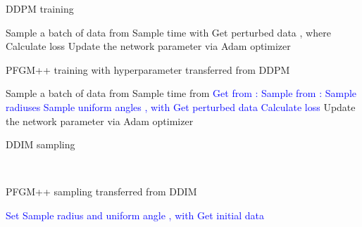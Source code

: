 \begin{minipage}{0.46\textwidth}
\vspace{-69pt}
\begin{algorithm}[H]
    \centering
    \caption{DDPM training}\label{algorithm-ddpm}
    \begin{algorithmic}[1]
        \STATE Sample a batch of data  from 
        \STATE Sample time  with  
        \STATE Get perturbed data ,
        where 
        \STATE Calculate loss 
        \STATE Update the network parameter  via Adam optimizer
    \end{algorithmic}
\end{algorithm}
\end{minipage}
\hfill
\begin{minipage}{0.50\textwidth}
\begin{algorithm}[H]
    \centering
    \caption{PFGM++ training with hyperparameter transferred from DDPM}\label{algorithm-ddpm-pfgmpp}
    \begin{algorithmic}[1]
        \STATE Sample a batch of data  from 
       \STATE Sample time  from 
       \STATE \textcolor{blue}{Get  from : }
        \STATE \textcolor{blue}{Sample  from : }
        \STATE  \textcolor{blue}{Sample radiuses }
        \STATE  \textcolor{blue}{Sample uniform angles , with }
        \STATE \textcolor{blue}{Get perturbed data }
        \STATE \textcolor{blue}{Calculate loss }
        \STATE Update the network parameter  via Adam optimizer
    \end{algorithmic}
\end{algorithm}
\end{minipage}

\begin{minipage}{0.46\textwidth}
\vspace{-44pt}
\begin{algorithm}[H]
    \centering
    \caption{DDIM sampling}\label{algorithm-ddpm-sample}
    \begin{algorithmic}[1]
\STATE 
\FOR{}
\STATE \\

\ENDFOR
    \end{algorithmic}
\end{algorithm}
\end{minipage}
\hfill
\begin{minipage}{0.50\textwidth}
\begin{algorithm}[H]
    \centering
    \caption{PFGM++ sampling transferred from DDIM}\label{algorithm-ddpm-pfgmpp-sample}
    \begin{algorithmic}[1]
     \STATE \textcolor{blue}{Set }
        \STATE  \textcolor{blue}{Sample radius 
       and  uniform angle , with }
        \STATE \textcolor{blue}{Get initial data }
\FOR{}
\STATE \\

\ENDFOR
    \end{algorithmic}
\end{algorithm}
\end{minipage}






